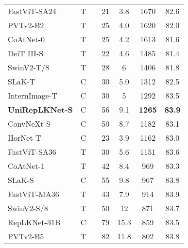 \documentclass[10pt,twocolumn,letterpaper]{article}
\begin{document}
\begin{table}[t!]
\begin{tabular}{l|c|c|c|c|c|c}
    FastViT-SA24~\cite{vasu2023fastvit}      &   T   &      &   21    &   3.8    &   1670    &   82.6    \\
    PVTv2-B2~\cite{wang2022pvt} & T &   & 25 & 4.0     &   1620    & 82.0 \\
    CoAtNet-0~\cite{dai2021coatnet} & T & & 25 & 4.2 &   1613& 81.6   \\
    DeiT III-S~\cite{touvron2022deit} & T &  & 22 & 4.6  &   1485    &   81.4\\
    SwinV2-T/8~\cite{liu2022swin} & T & & 28 & 6   &   1406    & 81.8 \\
    SLaK-T~\cite{liu2022more} & C &   & 30 & 5.0 & 1312 &82.5  \\
    InternImage-T~\cite{wang2023internimage}   & C     &        & 30        & 5        &   1292   &    83.5 \\
    \hline
    \rowcolor{gray!20}
    \textbf{UniRepLKNet-S}   &   C   &        &   56    &   9.1    &   \textbf{1265}   &    \textbf{83.9}    \\
    ConvNeXt-S~\cite{liu2022convnet}  &   C   &        &   50  &   8.7 &   1182    &   83.1\\
    HorNet-T~\cite{rao2022hornet} & C &  & 23 & 3.9 & 1162   &   83.0 \\
    FastViT-SA36~\cite{vasu2023fastvit}    &   T   &        &   30    &   5.6    &   1151    &   83.6     \\
    CoAtNet-1~\cite{dai2021coatnet} & T & & 42 & 8.4 &   969 & 83.3  \\
    SLaK-S~\cite{liu2022more} & C &  & 55 & 9.8 & 967   &83.8 \\
    FastViT-MA36~\cite{vasu2023fastvit}    &   T   &        &   43    &   7.9    &   914     &   83.9    \\
    SwinV2-S/8~\cite{liu2022swin} & T & & 50 & 12  &   871     & 83.7\\
    RepLKNet-31B~\cite{ding2022scaling} & C &  & 79 & 15.3 &    859 & 83.5\\
    PVTv2-B5~\cite{wang2022pvt} & T &   & 82 & 11.8    &   802     & 83.8 \\
    
    \hline
    \hline


\end{tabular}
\end{table}
\end{document}
